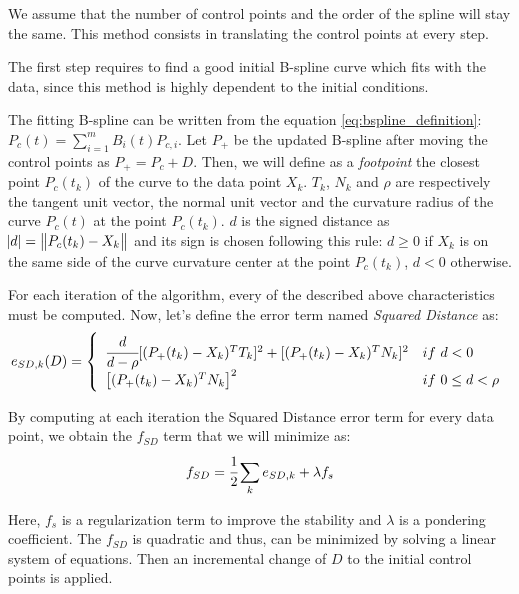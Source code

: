 \documentclass{article}
\newcommand{\vsp}{\vspace{\baselineskip}}
\begin{document}
We assume that the number of control points and the order of the spline will stay the same. This method consists in translating the control points at every step.

\vsp

The first step requires to find a good initial B-spline curve which fits with the data, since this method is highly dependent to the initial conditions.

\vsp

The fitting B-spline can be written from the equation \ref{eq:bspline_definition}: $P_c(t)=\sum\limits_{i=1}^m B_i(t)P_{c,i}$. Let $P_+$ be the updated B-spline after moving the control points as $P_+=P_c+D$. Then, we will define as a \textit{footpoint} the closest point $P_c(t_k)$ of the curve to the data point $X_k$. $T_k$, $N_k$ and $\rho$ are respectively the tangent unit vector, the normal unit vector and the curvature radius of the curve $P_c(t)$ at the point $P_c(t_k)$. $d$ is the signed distance as $\abs{d} = \left\lVert P_c(t_k) - X_k \right\rVert$ and its sign is chosen following this rule: $d \geq 0$ if $X_k$ is on the same side of the curve curvature center at the point $P_c(t_k)$, $d < 0$ otherwise. 

\vsp

For each iteration of the algorithm, every of the described above characteristics must be computed. Now, let's define the error term named \textit{Squared Distance} as:
\begin{equation}
    \label{eq:error_term}
    e_{SD,k}(D) = 
    \left \{
    \begin{array}{l l}
        \cfrac{d}{d-\rho}[(P_+(t_k)-X_k)^T T_k]^2 + [(P_+(t_k)-X_k)^T N_k]^2 & if\ d < 0 \\
        \big[(P_+(t_k)-X_k)^T N_k\big]^2 & if\ 0 \leq d < \rho 
    \end{array}
    \right .
\end{equation}

By computing at each iteration the Squared Distance error term for every data point, we obtain the $f_{SD}$ term that we will minimize as:
\begin{equation}
    \label{eq:fsd}
    f_{SD} = \cfrac{1}{2} \sum_{k} e_{SD,k} + \lambda f_s
\end{equation}

Here, $f_s$ is a regularization term to improve the stability and $\lambda$ is a pondering coefficient. The $f_{SD}$ is quadratic and thus, can be minimized by solving a linear system of equations. Then an incremental change of $D$ to the initial control points is applied.
\end{document}
